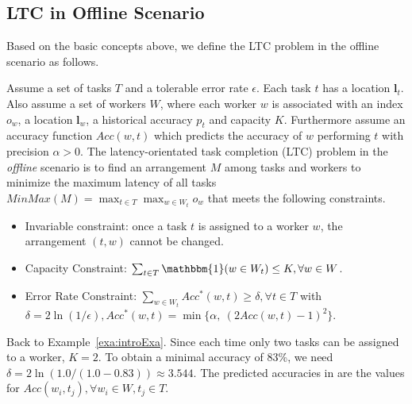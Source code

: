 \subsection{LTC in Offline Scenario}
Based on the basic concepts above, we define the LTC problem in the offline scenario as follows.
\begin{definition}
Assume a set of tasks $T$ and a tolerable error rate $\epsilon$.
Each task $t$ has a location $\boldsymbol{l}_t$.
Also assume a set of workers $W$, where each worker $w$ is associated with an index $o_w$, a location $\boldsymbol{l}_w$, a historical accuracy $p_t$ and capacity $K$.
Furthermore assume an accuracy function $Acc(w, t)$ which predicts the accuracy of $w$ performing $t$ with precision $\alpha > 0$.
The latency-orientated task completion (LTC) problem in the \textit{offline} scenario is to find an arrangement $M$ among tasks and workers to minimize the maximum latency of all tasks $MinMax(M) = \max_{t \in T}{\max_{w \in W_t} o_w}$ that meets the following constraints.
\begin{itemize}
  \item
  Invariable constraint: once a task $t$ is assigned to a worker $w$, the arrangement $(t, w)$ cannot be changed.
  \item
  Capacity Constraint: $\sum_{t \in T} \mathbbm{1}(w \in W_t) \le K, \forall w \in W$.
  \item
  Error Rate Constraint: $\sum_{w \in W_t} Acc^{*}(w,t) \ge \delta, \forall t \in T$ with $\delta = 2\ln(1/\epsilon), Acc^{*}(w,t) = \min\{\alpha,\ (2Acc(w,t) - 1)^2\}$.
\end{itemize}
\end{definition}

\begin{example}
Back to Example~\ref{exa:introExa}.
Since each time only two tasks can be assigned to a worker, $K = 2$.
To obtain a minimal accuracy of 83\%, we need $\delta = 2\ln(1.0/(1.0-0.83)) \approx 3.544$.
The predicted accuracies in  are the values for $Acc(w_i,t_j), \forall w_i \in W, t_j \in T $.
\end{example}

